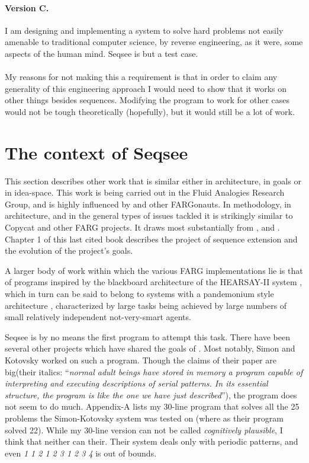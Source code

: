 \documentclass{article}
\begin{document}
\paragraph{Version C.}  I am designing and implementing a system to solve hard problems not easily amenable to traditional computer science, by reverse engineering, as it were, some aspects of the human mind.  Seqsee is but a test case.

\paragraph{} My reasons for not making this a requirement is that in order to claim any generality of this engineering approach I would need to show that it works on other things besides sequences.  Modifying the program to work for other cases would not be tough theoretically (hopefully), but it would still be a lot of work.

\tableofcontents

\section{The context of Seqsee}
\label{sec:context}

This section describes other work that is similar either in architecture, in goals or in idea-space. This work is being carried out in the Fluid Analogies Research Group, and is highly influenced by \hof and other FARGonauts. In methodology, in architecture, and in the general types of issues tackled it is strikingly similar to Copycat and other FARG projects. It draws most substantially from ,  and . Chapter 1 of this last cited book describes the project of sequence extension and the evolution of the project's goals.

A larger body of work within which the various FARG implementations lie is that of programs inspired by the blackboard architecture of the HEARSAY-II system \cite{Reddy}, which in turn can be said to belong to systems with a pandemonium style architecture \cite{Dennett:Consciousness}, characterized by large tasks being achieved by large numbers of small relatively independent not-very-smart agents. 

Seqsee is by no means the first program to attempt this task. There have been several other projects which have shared the  goals of \seq. Most notably, Simon and Kotovsky worked on such a program. Though the claims of their paper \cite{SimonKotovsky} are big(their italics: ``\emph{normal adult beings have stored in memory a program capable of interpreting and executing descriptions of serial patterns. In its essential structure, the program is like the one we have just described}''), the program does not seem to do much. Appendix-A lists my 30-line program that solves all the 25 problems the Simon-Kotovsky system was tested on (where as their program solved 22). While my 30-line version can not be called \emph{cognitively plausible}, I think that neither can their. Their system deals only with periodic patterns, and even \emph{1 1 2 1 2 3 1 2 3 4} is out of bounds.
\end{document}
